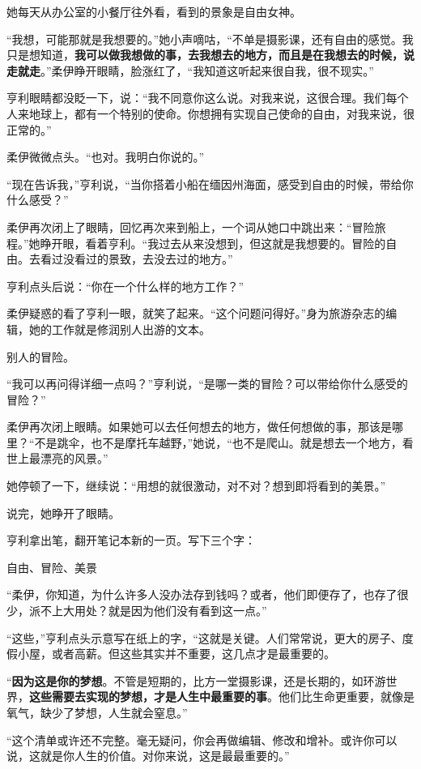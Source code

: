 她每天从办公室的小餐厅往外看，看到的景象是自由女神。

“我想，可能那就是我想要的。”她小声嘀咕，“不单是摄影课，还有自由的感觉。我只是想知道，\textbf{我可以做我想做的事，去我想去的地方，而且是在我想去的时候，说走就走}。”柔伊睁开眼睛，脸涨红了，“我知道这听起来很自我，很不现实。”

亨利眼睛都没眨一下，说：“我不同意你这么说。对我来说，这很合理。我们每个人来地球上，都有一个特别的使命。你想拥有实现自己使命的自由，对我来说，很正常的。”

柔伊微微点头。“也对。我明白你说的。”

“现在告诉我，”亨利说，“当你搭着小船在缅因州海面，感受到自由的时候，带给你什么感受？”

柔伊再次闭上了眼睛，回忆再次来到船上，一个词从她口中跳出来：“冒险旅程。”她睁开眼，看着亨利。“我过去从来没想到，但这就是我想要的。冒险的自由。去看过没看过的景致，去没去过的地方。”

亨利点头后说：“你在一个什么样的地方工作？”

柔伊疑惑的看了亨利一眼，就笑了起来。“这个问题问得好。”身为旅游杂志的编辑，她的工作就是修润别人出游的文本。

别人的冒险。

“我可以再问得详细一点吗？”亨利说，“是哪一类的冒险？可以带给你什么感受的冒险？”

柔伊再次闭上眼睛。如果她可以去任何想去的地方，做任何想做的事，那该是哪里？“不是跳伞，也不是摩托车越野，”她说，“也不是爬山。就是想去一个地方，看世上最漂亮的风景。”

她停顿了一下，继续说：“用想的就很激动，对不对？想到即将看到的美景。”

说完，她睁开了眼睛。

亨利拿出笔，翻开笔记本新的一页。写下三个字：

{\kaishu 自由、冒险、美景}

“柔伊，你知道，为什么许多人没办法存到钱吗？或者，他们即便存了，也存了很少，派不上大用处？就是因为他们没有看到这一点。”

“这些，”亨利点头示意写在纸上的字，“这就是关键。人们常常说，更大的房子、度假小屋，或者高薪。但这些其实并不重要，这几点才是最重要的。

“\textbf{因为这是你的梦想}。不管是短期的，比方一堂摄影课，还是长期的，如环游世界，\textbf{这些需要去实现的梦想，才是人生中最重要的事}。他们比生命更重要，就像是氧气，缺少了梦想，人生就会窒息。”

“这个清单或许还不完整。毫无疑问，你会再做编辑、修改和增补。或许你可以说，这就是你人生的价值。对你来说，这是最最重要的。”

